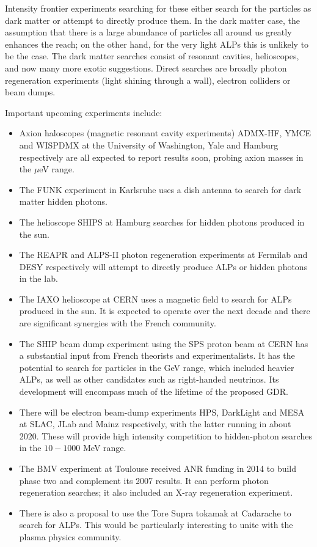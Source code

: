 Intensity frontier experiments searching for these either search for the particles as dark matter or attempt to directly produce them. In the dark matter case, the assumption that there is a large abundance of particles all around us greatly enhances the reach; on the other hand, for the very light ALPs this is unlikely to be the case. The dark matter searches consist of resonant cavities, helioscopes, and now many more exotic suggestions. Direct searches are broadly photon regeneration experiments (light shining through a wall), electron colliders or beam dumps. 

Important upcoming experiments include:
\begin{itemize}
\item Axion haloscopes (magnetic resonant cavity experiments) ADMX-HF, YMCE and WISPDMX at the University of Washington, Yale and Hamburg respectively are all expected to report results soon, probing axion masses in the $\mu$eV range. 
\item The FUNK experiment in Karlsruhe uses a dish antenna to search for dark matter hidden photons.
\item The helioscope SHIPS at Hamburg searches for hidden photons produced in the sun.
\item The REAPR and ALPS-II photon regeneration experiments at Fermilab and DESY respectively will attempt to directly produce ALPs or hidden photons in the lab.
\item The IAXO helioscope at CERN uses a magnetic field to search for ALPs produced in the sun. It is expected to operate over the next decade and there are significant synergies with the French community.
\item The SHIP  beam dump experiment using the SPS proton beam at CERN has a substantial input from French theorists and experimentalists. It has the potential to search for particles in the GeV range, which included heavier ALPs, as well as other candidates such as right-handed neutrinos. Its development will encompass much of the lifetime of the proposed GDR.
\item There will be electron beam-dump experiments HPS, DarkLight and MESA at SLAC, JLab and Mainz respectively, with the latter running in about 2020. These will provide high intensity competition to hidden-photon searches in the $10-1000$ MeV range.
\item The BMV experiment at Toulouse received ANR funding in 2014 to build phase two and complement its 2007 results. It can perform photon regeneration searches; it also included an X-ray regeneration experiment.
\item There is also a proposal to use the Tore Supra tokamak at Cadarache to search for ALPs. This would be particularly interesting to unite with the plasma physics community. 
\end{itemize}


